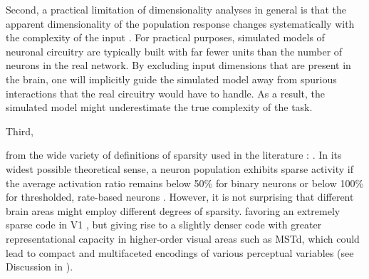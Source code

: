 Second, a practical limitation of dimensionality analyses in general
is that the apparent dimensionality of the population response changes
systematically with the complexity of the input 
\cite{SpanneJorntell2015,Cowley2016,Mazzucato2016}.
For practical purposes, simulated models of neuronal circuitry are typically
built with far fewer units than the number of neurons in the real network.
By excluding input dimensions that are present in the brain,
one will implicitly guide the simulated model away from spurious interactions
that the real circuitry would have to handle.
As a result, the simulated model might underestimate 
the true complexity of the task.

Third, 

 from the wide variety of definitions of sparsity
used in the literature \cite{SpanneJorntell2015,BarthPoulet2012}:
.
In its widest possible theoretical sense,
a neuron population exhibits sparse activity if the average activation ratio
remains below 50\% for binary neurons 
or below 100\% for thresholded,
rate-based neurons \cite{SpanneJorntell2015}.
However, it is not surprising that different brain areas might employ
different degrees of sparsity.
favoring an extremely sparse code in \ac{V1}
\cite{OlshausenField1996},
but giving rise to a slightly denser code with 
greater representational capacity in higher-order visual areas
such as \ac{MSTd}, 
which could lead to compact and multifaceted encodings
of various perceptual variables
(see Discussion in \cite{Beyeler2016}).

